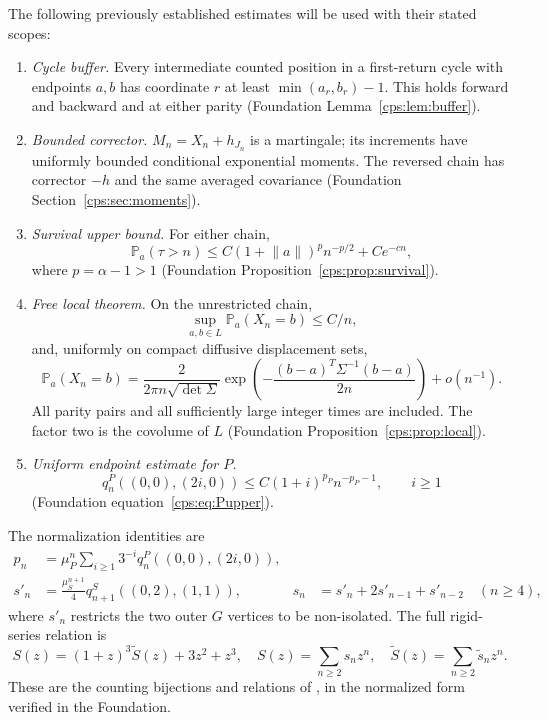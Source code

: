 \documentclass[11pt,letterpaper]{article}
\numberwithin{equation}{section}
\theoremstyle{remark}\newtheorem{remark}[theorem]{Remark}
\newcommand{\PP}{\mathbb P}
\newcommand{\norm}[1]{\lVert#1\rVert}
\begin{document}
The following previously established estimates will be used with their stated scopes:
\begin{enumerate}
\item \emph{Cycle buffer.} Every intermediate counted position in a first-return cycle with endpoints $a,b$ has coordinate $r$ at least $\min(a_r,b_r)-1$. This holds forward and backward and at either parity (Foundation Lemma~\ref{cps:lem:buffer}).
\item \emph{Bounded corrector.} $M_n=X_n+h_{J_n}$ is a martingale; its increments have uniformly bounded conditional exponential moments. The reversed chain has corrector $-h$ and the same averaged covariance (Foundation Section~\ref{cps:sec:moments}).
\item \emph{Survival upper bound.} For either chain,
\begin{equation}\label{cps:amp:eq:survivalupper}
 \PP_a(\tau>n)\le C(1+\norm a)^p n^{-p/2}+Ce^{-cn},
\end{equation}
where $p=\alpha-1>1$ (Foundation Proposition~\ref{cps:prop:survival}).
\item \emph{Free local theorem.} On the unrestricted chain,
\begin{equation}\label{cps:amp:eq:freeupper}
 \sup_{a,b\in L}\PP_a(X_n=b)\le C/n,
\end{equation}
and, uniformly on compact diffusive displacement sets,
\begin{equation}\label{cps:amp:eq:freelocal}
 \PP_a(X_n=b)=\frac{2}{2\pi n\sqrt{\det\Sigma}}
 \exp\!\left(-\frac{(b-a)^T\Sigma^{-1}(b-a)}{2n}\right)+o(n^{-1}).
\end{equation}
All parity pairs and all sufficiently large integer times are included. The factor two is the covolume of $L$ (Foundation Proposition~\ref{cps:prop:local}).
\item \emph{Uniform endpoint estimate for $P$.}
\begin{equation}\label{cps:amp:eq:endpointupper}
 q_n^P((0,0),(2i,0))\le C(1+i)^{p_P}n^{-p_P-1},\qquad i\ge1
\end{equation}
(Foundation equation~\eqref{cps:eq:Pupper}).
\end{enumerate}
The normalization identities are
\begin{align}
 p_n&=\mu_P^n\sum_{i\ge1}3^{-i}q_n^P((0,0),(2i,0)),\label{cps:amp:eq:Pcount}\\
 s'_n&=\frac{\mu_S^{n+1}}4q_{n+1}^S((0,2),(1,1)),
 &s_n&=s'_n+2s'_{n-1}+s'_{n-2}\quad(n\ge4),\label{cps:amp:eq:Scount}
\end{align}
where $s'_n$ restricts the two outer $G$ vertices to be non-isolated. The full rigid-series relation is
\begin{equation}\label{cps:amp:eq:series}
 S(z)=(1+z)^3\widetilde S(z)+3z^2+z^3,
 \quad S(z)=\sum_{n\ge2}s_nz^n,\quad
 \widetilde S(z)=\sum_{n\ge2}\widetilde s_nz^n.
\end{equation}
These are the counting bijections and relations of \cite[Propositions 13--14, Remarks 9 and 20]{FNS}, in the normalized form verified in the Foundation.
\end{document}
